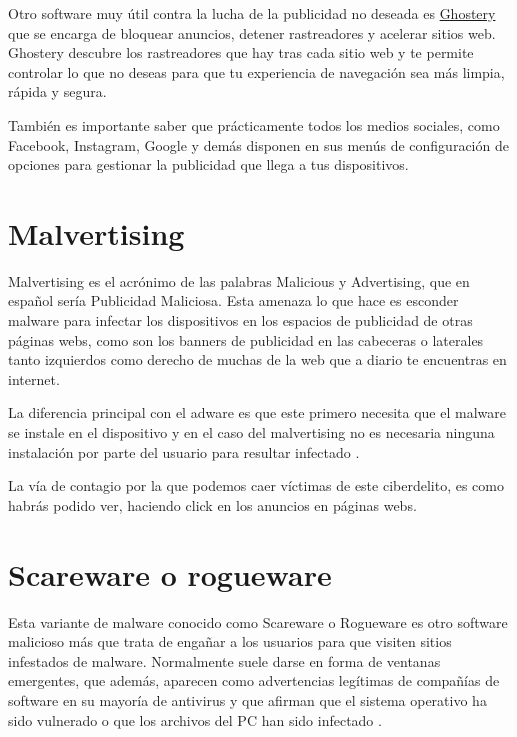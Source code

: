 \documentclass[
  spanish,
  a4paper,
  openany]{book}
\begin{document}
Otro software muy útil contra la lucha de la publicidad no deseada es \href{https://www.ghostery.com/}{Ghostery} que se encarga de bloquear anuncios, detener rastreadores y acelerar sitios web. Ghostery descubre los rastreadores que hay tras cada sitio web y te permite controlar lo que no deseas para que tu experiencia de navegación sea más limpia, rápida y segura.

También es importante saber que prácticamente todos los medios sociales, como Facebook, Instagram, Google y demás disponen en sus menús de configuración de opciones para gestionar la publicidad que llega a tus dispositivos.

\hypertarget{malvertising}{%
\section{Malvertising}\label{malvertising}}

Malvertising es el acrónimo de las palabras Malicious y Advertising, que en español sería Publicidad Maliciosa. Esta amenaza lo que hace es esconder malware para infectar los dispositivos en los espacios de publicidad de otras páginas webs, como son los banners de publicidad en las cabeceras o laterales tanto izquierdos como derecho de muchas de la web que a diario te encuentras en internet.

La diferencia principal con el adware es que este primero necesita que el malware se instale en el dispositivo y en el caso del malvertising no es necesaria ninguna instalación por parte del usuario para resultar infectado \citep{OSI-malvertising}.

La vía de contagio por la que podemos caer víctimas de este ciberdelito, es como habrás podido ver, haciendo click en los anuncios en páginas webs.

\hypertarget{scareware-o-rogueware}{%
\section{Scareware o rogueware}\label{scareware-o-rogueware}}

Esta variante de malware conocido como Scareware o Rogueware es otro software malicioso más que trata de engañar a los usuarios para que visiten sitios infestados de malware. Normalmente suele darse en forma de ventanas emergentes, que además, aparecen como advertencias legítimas de compañías de software en su mayoría de antivirus y que afirman que el sistema operativo ha sido vulnerado o que los archivos del PC han sido infectado \citep{KASPER-scareware}.
\end{document}

